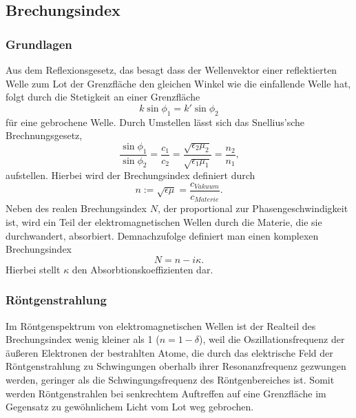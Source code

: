 \subsection{Brechungsindex}
\subsubsection*{Grundlagen}
Aus dem Reflexionsgesetz, das besagt dass der Wellenvektor einer reflektierten Welle zum Lot der Grenzfläche den gleichen Winkel wie die einfallende Welle hat,
folgt durch die Stetigkeit an einer Grenzfläche
\begin{equation}
    k \sin \phi_1 = k' \sin \phi_2
    \label{eq:Stetigkeit}
\end{equation}
für eine gebrochene Welle.
Durch Umstellen lässt sich das Snellius'sche Brechnungsgesetz,
\begin{equation}
    \frac{\sin \phi_1}{\sin \phi_2} = \frac{c_1}{c_2} = \frac{\sqrt{\epsilon_2\mu_2}}{\sqrt{\epsilon_1\mu_1}} = \frac{n_2}{n_1} \text{,}
    \label{eq:Snellius}
\end{equation}
aufstellen. Hierbei wird der Brechungsindex definiert durch
\begin{equation}
    n := \sqrt{\epsilon\mu} = \frac{c_{Vakuum}}{c_{Materie}}.
\end{equation}
Neben des realen Brechungsindex $N$, der proportional zur Phasengeschwindigkeit ist,
wird ein Teil der elektromagnetischen Wellen durch die Materie, die sie durchwandert, absorbiert.
Demnachzufolge definiert man einen komplexen Brechungsindex
\begin{equation}
    N = n - i\kappa \text{.}
    \label{eq:nKomplex}
\end{equation}
Hierbei stellt $\kappa$ den Absorbtionskoeffizienten dar.

\subsubsection*{Röntgenstrahlung}
Im Röntgenspektrum von elektromagnetischen Wellen ist der Realteil des Brechungsindex wenig kleiner als 1 ($n = 1 - \delta$),
weil die Oszillationsfrequenz der äußeren Elektronen der bestrahlten Atome, die durch das elektrische Feld der Röntgenstrahlung zu Schwingungen oberhalb
ihrer Resonanzfrequenz gezwungen werden, geringer als die Schwingungsfrequenz des Röntgenbereiches ist.
Somit werden Röntgenstrahlen bei senkrechtem Auftreffen auf eine Grenzfläche im Gegensatz zu gewöhnlichem Licht vom Lot weg gebrochen.

